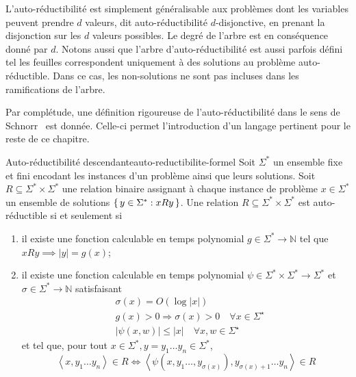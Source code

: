L'auto-réductibilité est simplement généralisable aux problèmes dont les variables peuvent prendre $d$ valeurs, dit auto-réductibilité $d$-disjonctive, en prenant la disjonction sur les $d$ valeurs possibles. Le degré de l'arbre est en conséquence donné par $d$. Notons aussi que l'arbre d'auto-réductibilité est aussi parfois défini tel les feuilles correspondent uniquement à des solutions au problème auto-réductible. Dans ce cas, les non-solutions ne sont pas incluses dans les ramifications de l'arbre.



Par complétude, une définition rigoureuse de l'auto-réductibilité dans le sens de Schnorr~\cite{schnorrOptimalAlgorithmsSelfReducible1976} est donnée. Celle-ci permet l'introduction d'un langage pertinent pour le reste de ce chapitre.
\begin{maindefinition}{Auto-réductibilité descendante}{auto-reductibilite-formel}
    Soit $\Sigma^{*}$ un ensemble fixe et fini encodant les instances d'un problème ainsi que leurs solutions. Soit $R \subseteq \Sigma^{*} \times \Sigma^{*}$ une relation binaire assignant à chaque instance de problème $x \in \Sigma^{*}$ un ensemble de solutions $\set{ y \in \Sigma^{*} : xRy }$. Une relation $R \subseteq \Sigma^{*} \times \Sigma^{*}$ est auto-réductible si et seulement si
    \begin{enumerate}[(1)]
        \item il existe une fonction calculable en temps polynomial $g \in \Sigma^{*} \to \mathbb{N}$ tel que $xRy \implies \lvert y \rvert = g(x)$;
        \item il existe une fonction calculable en temps polynomial $\psi \in \Sigma^{*} \times \Sigma^{*} \to \Sigma^{*}$ et $\sigma \in \Sigma^{*} \to \mathbb{N}$ satisfaisant
        \begin{align*}
            & \sigma(x)=O(\log |x|) \\
            & g(x)>0 \Rightarrow \sigma(x)>0 \quad \forall x \in \Sigma^{\star} \\
            & |\psi(x, w)| \leqslant|x| \quad \forall x, w \in \Sigma^{\star}
        \end{align*}
        et tel que, pour tout $x \in \Sigma^{*}, y=y_1 \ldots y_n \in \Sigma^{*}$, 
        \begin{equation*}
            \left\langle x, y_1 \ldots y_n \right\rangle \in R \Leftrightarrow \left\langle \psi \left( x, y_1 \ldots, y_{\sigma(x)} \right), y_{\sigma(x)+1} \ldots y_n \right\rangle \in R
        \end{equation*}
    \end{enumerate}
\end{maindefinition}

